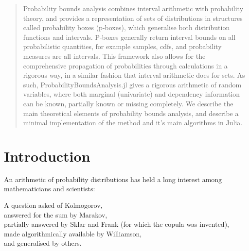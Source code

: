 \documentclass{juliacon}
\begin{document}


\maketitle

\begin{abstract}

Probability bounds analysis combines interval arithmetic with probability theory, and provides a representation of sets of distributions in structures called probability boxes (p-boxes), which generalise both distribution functions and intervals. P-boxes generally return interval bounds on all probabilistic quantities, for example samples, cdfs, and probability measures are all intervals. This framework also allows for the comprehensive propagation of probabilities through calculations in a rigorous way, in a similar fashion that interval arithmetic does for sets. As such, ProbabilityBoundsAnalysis.jl gives a rigorous arithmetic of random variables, where both marginal (univariate) and dependency information can be known, partially known or missing completely. We describe the main theoretical elements of probability bounds analysis, and describe a minimal implementation of the method and it's main algorithms in Julia.

\end{abstract}

\section{Introduction}
\label{sec:intro}


An arithmetic of probability distributions has held a long interest among mathematicians and scientists:
\begin{displayquote}
  A question asked of Kolmogorov, \\
  answered for the sum by Marakov, \\
  partially answered by Sklar and Frank (for which the copula was invented),\\
  made algorithmically available by Williamson, \\
  and generalised by others.
\end{displayquote}
\end{document}
